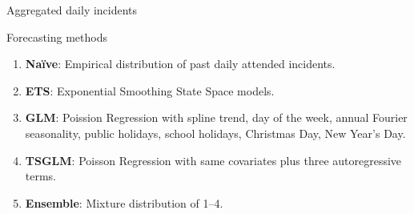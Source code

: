 \documentclass[
  14pt,
  ignorenonframetext,
  aspectratio=169,
]{beamer}
\providecommand{\tightlist}{%
  \setlength{\itemsep}{0pt}\setlength{\parskip}{0pt}}\usepackage{longtable,booktabs,array}
\begin{document}
\begin{frame}{Aggregated daily incidents}
\end{frame}

\begin{frame}{Forecasting methods}
\label{forecasting-methods}
\begin{enumerate}
\tightlist
\item
  \textbf{Naïve}: Empirical distribution of past daily attended
  incidents.
\item
  \textbf{ETS}: Exponential Smoothing State Space models.
\item
  \textbf{GLM}: Poission Regression with spline trend, day of the week,
  annual Fourier seasonality, public holidays, school holidays,
  Christmas Day, New Year's Day.
\item
  \textbf{TSGLM}: Poisson Regression with same covariates plus three
  autoregressive terms.
\item
  \textbf{Ensemble}: Mixture distribution of 1--4.
\end{enumerate}
\end{frame}
\end{document}
